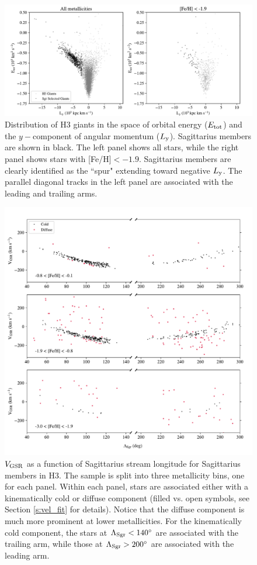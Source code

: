 \documentclass[twocolumn,tighten,twocolappendix]{aastex63}
\newcommand{\sgr}{Sagittarius}
\newcommand{\Ly}{L_{\rm y}}
\newcommand{\Vgsr}{V_{\rm GSR}}
\begin{document}
\begin{CJK*}{UTF8}{gbsn}
\begin{figure}[!t]
\includegraphics[width=\textwidth]{energy_ly.pdf}
\caption{Distribution of H3 giants in the space of orbital energy ($E_{\rm tot}$) and the $y-$component of angular momentum ($\Ly$).  \sgr{} members are shown in black.  The left panel shows all stars, while the right panel shows stars with [Fe/H]$<-1.9$.  \sgr{} members are clearly identified as the ``spur" extending toward negative $\Ly$.  The parallel diagonal tracks in the left panel are associated with the leading and trailing arms.
\label{fig:ely}}
\end{figure}


\begin{figure}
\includegraphics[width=\textwidth]{vgsr_lambda_feh.pdf}
\caption{
  $\Vgsr$ as a function of \sgr{} stream longitude for \sgr{} members in H3.  The sample is split into three metallicity bins, one for each panel.  Within each panel, stars are associated either with a kinematically cold or diffuse component (filled vs. open symbols, see Section \ref{s:vel_fit} for details).   Notice that the diffuse component is much more prominent at lower metallicities.  For the kinematically cold component, the stars at $\Lambda_{\rm Sgr}<140^\circ$ are associated with the trailing arm, while those at $\Lambda_{\rm Sgr}>200^\circ$ are associated with the leading arm.
\label{fig:vgsrfeh}}
\end{figure}


\end{CJK*}
\end{document}
